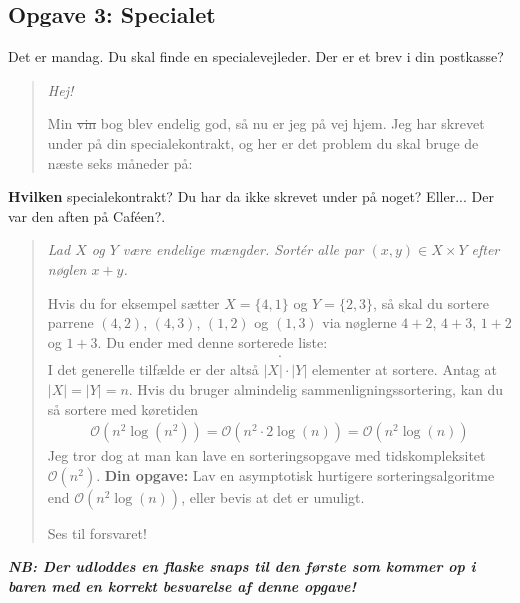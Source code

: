 \subsection{Opgave 3: Specialet}


Det er mandag.  Du skal finde en specialevejleder.  Der er et brev i din
postkasse?

\begin{quote}

{\em Hej!

Min \sout{vin} \hspace{1mm} bog blev endelig god, så nu er jeg på vej hjem.  Jeg
har skrevet under på din specialekontrakt, og her er det problem du skal bruge
de næste seks måneder på:
}

\end{quote}

\textbf{Hvilken} specialekontrakt?  Du har da ikke skrevet under på noget?
Eller...  Der var den aften på Caféen?.

\begin{quote}

{\em Lad $X$ og $Y$ være endelige mængder.  Sortér alle par
$(x, y) \in X \times Y$ efter nøglen $x + y$.

Hvis du for eksempel sætter $X = \{4, 1\}$ og $Y = \{2, 3\}$, så skal du sortere
parrene $(4, 2)$, $(4, 3)$, $(1, 2)$ og $(1, 3)$ via nøglerne $4 + 2$, $4 + 3$,
$1 + 2$ og $1 + 3$.  Du ender med denne sorterede liste:
\vspace{-1mm}
\begin{align*}
[(1, 2), (1, 3), (4, 2), (4, 3)].
\end{align*}
\vspace{-1mm}
I det generelle tilfælde er der altså $\left| X \right| \cdot \left| Y \right|$
elementer at sortere.  Antag at $\left| X \right| = \left| Y \right| = n$.  Hvis
du bruger almindelig sammenligningssortering, kan du så sortere med køretiden
\begin{align*}
  \mathcal{O}\left( n^2\log\left( n^2 \right) \right)
  = \mathcal{O}\left( n^2 \cdot 2 \log\left( n \right) \right)
  = \mathcal{O}\left( n^2 \log\left( n \right) \right)
\end{align*}
Jeg tror dog at man kan lave en sorteringsopgave med tidskompleksitet
$\mathcal{O}\left( n^2 \right)$.  \textbf{Din opgave:} Lav en asymptotisk
hurtigere sorteringsalgoritme end
$\mathcal{O}\left( n^2 \log\left( n \right) \right)$, eller bevis at det er
umuligt.

Ses til forsvaret!
}

\end{quote}
\vspace{-1mm}
\textbf{\emph{NB: Der udloddes en flaske snaps til den første som kommer op i
baren med en korrekt besvarelse af denne opgave!}}
